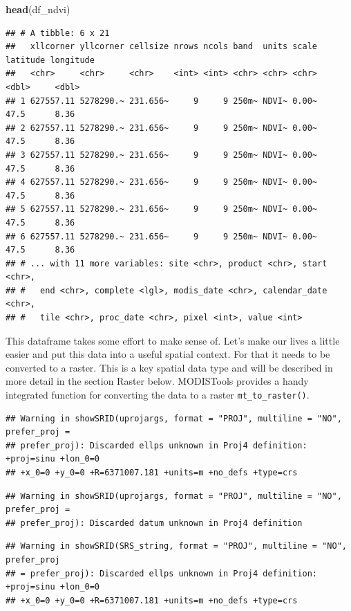 \documentclass[
]{book}
\newenvironment{Shaded}{\begin{snugshade}}{\end{snugshade}}
\newcommand{\KeywordTok}[1]{\textcolor[rgb]{0.13,0.29,0.53}{\textbf{#1}}}
\newcommand{\NormalTok}[1]{#1}
\begin{document}
\begin{Shaded}
\begin{Highlighting}[]
\KeywordTok{head}\NormalTok{(df_ndvi)}
\end{Highlighting}
\end{Shaded}

\begin{verbatim}
## # A tibble: 6 x 21
##   xllcorner yllcorner cellsize nrows ncols band  units scale latitude longitude
##   <chr>     <chr>     <chr>    <int> <int> <chr> <chr> <chr>    <dbl>     <dbl>
## 1 627557.11 5278290.~ 231.656~     9     9 250m~ NDVI~ 0.00~     47.5      8.36
## 2 627557.11 5278290.~ 231.656~     9     9 250m~ NDVI~ 0.00~     47.5      8.36
## 3 627557.11 5278290.~ 231.656~     9     9 250m~ NDVI~ 0.00~     47.5      8.36
## 4 627557.11 5278290.~ 231.656~     9     9 250m~ NDVI~ 0.00~     47.5      8.36
## 5 627557.11 5278290.~ 231.656~     9     9 250m~ NDVI~ 0.00~     47.5      8.36
## 6 627557.11 5278290.~ 231.656~     9     9 250m~ NDVI~ 0.00~     47.5      8.36
## # ... with 11 more variables: site <chr>, product <chr>, start <chr>,
## #   end <chr>, complete <lgl>, modis_date <chr>, calendar_date <chr>,
## #   tile <chr>, proc_date <chr>, pixel <int>, value <int>
\end{verbatim}

This dataframe takes some effort to make sense of. Let's make our lives a little easier and put this data into a useful spatial context. For that it needs to be converted to a raster. This is a key spatial data type and will be described in more detail in the section Raster below.
MODISTools provides a handy integrated function for converting the data to a raster \texttt{mt\_to\_raster()}.

\begin{verbatim}
## Warning in showSRID(uprojargs, format = "PROJ", multiline = "NO", prefer_proj =
## prefer_proj): Discarded ellps unknown in Proj4 definition: +proj=sinu +lon_0=0
## +x_0=0 +y_0=0 +R=6371007.181 +units=m +no_defs +type=crs
\end{verbatim}

\begin{verbatim}
## Warning in showSRID(uprojargs, format = "PROJ", multiline = "NO", prefer_proj =
## prefer_proj): Discarded datum unknown in Proj4 definition
\end{verbatim}

\begin{verbatim}
## Warning in showSRID(SRS_string, format = "PROJ", multiline = "NO", prefer_proj
## = prefer_proj): Discarded ellps unknown in Proj4 definition: +proj=sinu +lon_0=0
## +x_0=0 +y_0=0 +R=6371007.181 +units=m +no_defs +type=crs
\end{verbatim}
\end{document}
